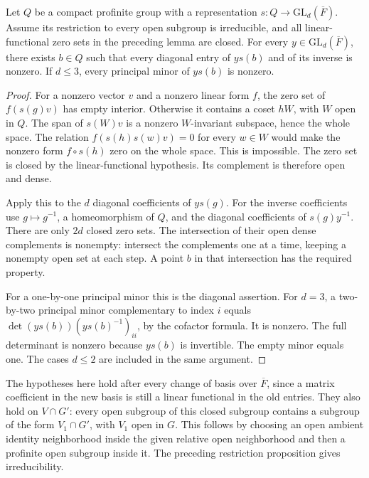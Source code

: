 \begin{srlemma}
\label{lem:sr-curve-coset-minors}
Let \(Q\) be a compact profinite group with a representation
\(s:Q\to\mathrm{GL}_d(\overline F)\).
Assume its restriction to every open subgroup is irreducible,
and all linear-functional zero sets in the preceding lemma
are closed.
For every \(y\in\mathrm{GL}_d(\overline F)\), there exists
\(b\in Q\) such that every diagonal entry of \(ys(b)\)
and of its inverse is nonzero.
If \(d\le3\), every principal minor of \(ys(b)\) is nonzero.
\end{srlemma}
\begin{proof}
For a nonzero vector \(v\) and a nonzero linear form \(f\),
the zero set of \(f(s(g)v)\) has empty interior.
Otherwise it contains a coset \(hW\), with \(W\) open in \(Q\).
The span of \(s(W)v\) is a nonzero \(W\)-invariant subspace,
hence the whole space.  The relation
\(f(s(h)s(w)v)=0\) for every \(w\in W\) would make
the nonzero form \(f\circ s(h)\) zero on the whole space.
This is impossible.
The zero set is closed by the linear-functional hypothesis.
Its complement is therefore open and dense.

Apply this to the \(d\) diagonal coefficients of \(ys(g)\).
For the inverse coefficients use \(g\mapsto g^{-1}\), a
homeomorphism of \(Q\), and the diagonal coefficients of
\(s(g)y^{-1}\).
There are only \(2d\) closed zero sets.
The intersection of their open dense complements is nonempty:
intersect the complements one at a time, keeping a nonempty
open set at each step.
A point \(b\) in that intersection has the required property.

For a one-by-one principal minor this is the diagonal assertion.
For \(d=3\), a two-by-two principal minor complementary to
index \(i\) equals
\(\det(ys(b))(ys(b)^{-1})_{ii}\), by the cofactor formula.
It is nonzero.  The full determinant is nonzero because
\(ys(b)\) is invertible.  The empty minor equals one.
The cases \(d\le2\) are included in the same argument.
\end{proof}

The hypotheses here hold after every change of basis over
\(\overline F\), since a matrix coefficient in the new basis is
still a linear functional in the old entries.
They also hold on \(V\cap G'\): every open subgroup of this
closed subgroup contains a subgroup of the form
\(V_1\cap G'\), with \(V_1\) open in \(G\).
This follows by choosing an open ambient identity neighborhood
inside the given relative open neighborhood and then a
profinite open subgroup inside it.
The preceding restriction proposition gives irreducibility.

